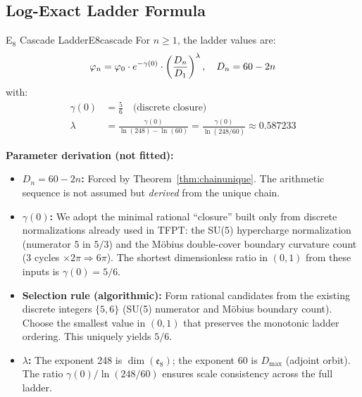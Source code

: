 \subsection{Log-Exact Ladder Formula}

\begin{definition}{E$_8$ Cascade Ladder}{E8cascade}
For $n \geq 1$, the ladder values are:
\begin{equation}
    \varphi_n = \varphi_0 \cdot e^{-\gamma(0)} \cdot 
        \left(\frac{D_n}{D_1}\right)^\lambda, \quad D_n = 60 - 2n
    \label{eq:ladder}
\end{equation}
with:
\begin{align}
    \gamma(0) &= \frac{5}{6} \quad \text{(discrete closure)}\\
    \lambda &= \frac{\gamma(0)}{\ln(248) - \ln(60)} = \frac{\gamma(0)}{\ln(248/60)} 
        \approx 0.587233
\end{align}
\end{definition}

\textbf{Parameter derivation (not fitted):}
\begin{itemize}[leftmargin=1.5em, topsep=2pt, itemsep=2pt]
    \item \textbf{$D_n = 60 - 2n$:} Forced by Theorem~\ref{thm:chainunique}. The 
        arithmetic sequence is not assumed but \emph{derived} from the unique chain.
    \item \textbf{$\gamma(0)$:} We adopt the minimal rational ``closure'' built only from 
        discrete normalizations already used in TFPT: the SU(5) hypercharge normalization (numerator $5$ in $5/3$) 
        and the M\"obius double-cover boundary curvature count ($3$ cycles $\times 2\pi \Rightarrow 6\pi$). 
        The shortest dimensionless ratio in $(0,1)$ from these inputs is $\gamma(0)=5/6$.
    \item \textbf{Selection rule (algorithmic):} Form rational candidates from the existing discrete
        integers $\{5,6\}$ (SU(5) numerator and M\"obius boundary count). Choose the smallest
        value in $(0,1)$ that preserves the monotonic ladder ordering. This uniquely yields $5/6$.
    \item \textbf{$\lambda$:} The exponent 248 is $\dim(\mathfrak{e}_8)$; the exponent 60 
        is $D_{\max}$ (adjoint orbit). The ratio $\gamma(0)/\ln(248/60)$ ensures scale 
        consistency across the full ladder.
\end{itemize}

